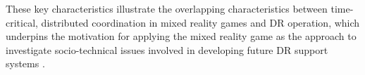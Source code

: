 These key characteristics illustrate the overlapping characteristics between time-critical, distributed coordination in mixed reality games and \ac{DR} operation, which underpins the motivation for applying the mixed reality game as the approach to investigate socio-technical issues involved in developing future \ac{DR} support systems \citep{Fischer2012}.\\








